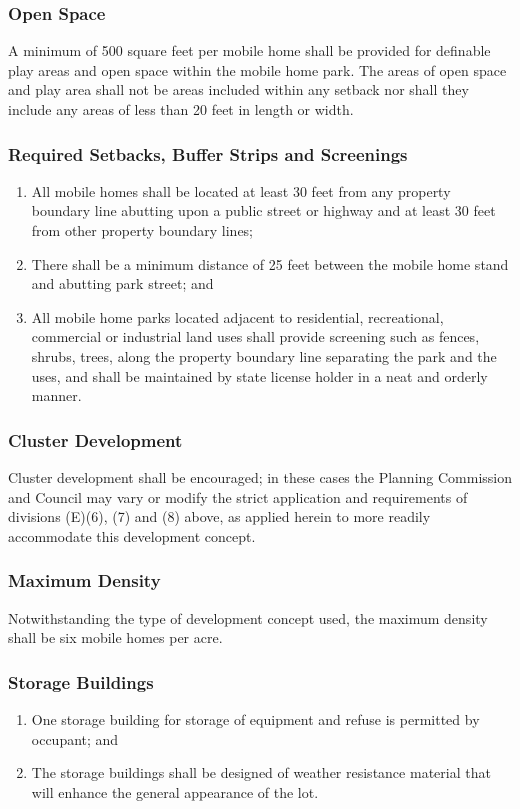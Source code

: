 \subsubsection{Open Space}
A minimum of 500 square feet per mobile home shall be provided for definable play areas and open space within the mobile home park. The areas of open space and play area shall not be areas included within any setback nor shall they include any areas of less than 20 feet in length or width.
\subsubsection{Required Setbacks, Buffer Strips and Screenings}
\begin{enumerate}[{\indent}a)]
    \item All mobile homes shall be located at least 30 feet from any property boundary line abutting upon a public street or highway and at least 30 feet from other property boundary lines; 
    \item There shall be a minimum distance of 25 feet between the mobile home stand and abutting park street; and 
    \item All mobile home parks located adjacent to residential, recreational, commercial or industrial land uses shall provide screening such as fences, shrubs, trees, along the property boundary line separating the park and the uses, and shall be maintained by state license holder in a neat and orderly manner.
\end{enumerate}
\subsubsection{Cluster Development}
Cluster development shall be encouraged; in these cases the Planning Commission and Council may vary or modify the strict application and requirements of divisions (E)(6), (7) and (8) above, as applied herein to more readily accommodate this development concept.
\subsubsection{Maximum Density}
Notwithstanding the type of development concept used, the maximum density shall be six mobile homes per acre.
\subsubsection{Storage Buildings}
\begin{enumerate}[{\indent}a)]
    \item One storage building for storage of equipment and refuse is permitted by occupant; and 
    \item The storage buildings shall be designed of weather resistance material that will enhance the general appearance of the lot.
\end{enumerate}

